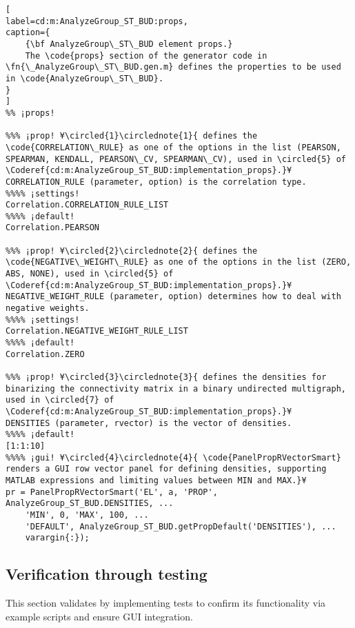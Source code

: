 \documentclass{tufte-handout}
\begin{document}
\begin{lstlisting}[
label=cd:m:AnalyzeGroup_ST_BUD:props,
caption={
	{\bf AnalyzeGroup\_ST\_BUD element props.}
	The \code{props} section of the generator code in \fn{\_AnalyzeGroup\_ST\_BUD.gen.m} defines the properties to be used in \code{AnalyzeGroup\_ST\_BUD}.
}
]
%% ¡props!

%%% ¡prop! ¥\circled{1}\circlednote{1}{ defines the \code{CORRELATION\_RULE} as one of the options in the list (PEARSON, SPEARMAN, KENDALL, PEARSON\_CV, SPEARMAN\_CV), used in \circled{5} of \Coderef{cd:m:AnalyzeGroup_ST_BUD:implementation_props}.}¥
CORRELATION_RULE (parameter, option) is the correlation type.
%%%% ¡settings!
Correlation.CORRELATION_RULE_LIST
%%%% ¡default!
Correlation.PEARSON

%%% ¡prop! ¥\circled{2}\circlednote{2}{ defines the \code{NEGATIVE\_WEIGHT\_RULE} as one of the options in the list (ZERO, ABS, NONE), used in \circled{5} of \Coderef{cd:m:AnalyzeGroup_ST_BUD:implementation_props}.}¥
NEGATIVE_WEIGHT_RULE (parameter, option) determines how to deal with negative weights.
%%%% ¡settings!
Correlation.NEGATIVE_WEIGHT_RULE_LIST
%%%% ¡default!
Correlation.ZERO

%%% ¡prop! ¥\circled{3}\circlednote{3}{ defines the densities for binarizing the connectivity matrix in a binary undirected multigraph, used in \circled{7} of \Coderef{cd:m:AnalyzeGroup_ST_BUD:implementation_props}.}¥
DENSITIES (parameter, rvector) is the vector of densities.
%%%% ¡default!
[1:1:10]
%%%% ¡gui! ¥\circled{4}\circlednote{4}{ \code{PanelPropRVectorSmart} renders a GUI row vector panel for defining densities, supporting MATLAB expressions and limiting values between MIN and MAX.}¥
pr = PanelPropRVectorSmart('EL', a, 'PROP', AnalyzeGroup_ST_BUD.DENSITIES, ...
    'MIN', 0, 'MAX', 100, ...
    'DEFAULT', AnalyzeGroup_ST_BUD.getPropDefault('DENSITIES'), ...
    varargin{:});
\end{lstlisting}

\subsection{Verification through testing}
This section validates  by implementing tests to confirm its functionality via example scripts and ensure GUI integration.
\end{document}
